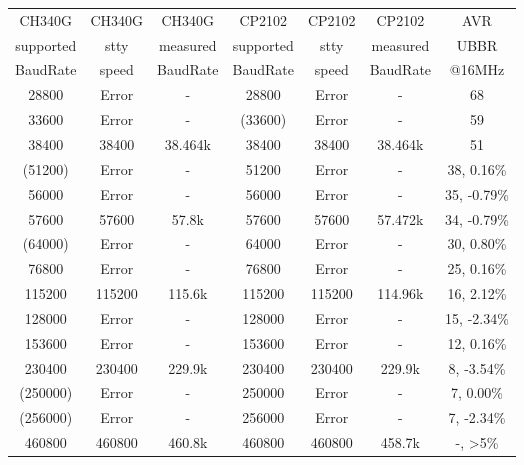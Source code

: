 \begin{table}[H]
  \begin{center}
    \begin{tabular}{| c | c | c || c | c | c || c |}
    \hline
    CH340G     & CH340G & CH340G    &  CP2102   & CP2102 & CP2102    & AVR \\
    supported  & stty   & measured  & supported & stty   & measured  & UBBR  \\
    BaudRate   & speed  & BaudRate  & BaudRate  & speed  & BaudRate  & @16MHz \\
    \hline
    \hline
      28800  &  Error   &   -       &  28800    & Error  &    -      &   68 \\
    \hline
      33600  &  Error   &   -       & (33600)   & Error  &    -      &   59  \\
    \hline
      38400  &  38400   &  38.464k  &  38400    & 38400  &  38.464k   &   51  \\
    \hline
     (51200) &  Error   &   -       &  51200    & Error  &    -      &   38,  0.16\%  \\
    \hline
      56000  &  Error   &   -       &  56000    & Error  &    -      &   35, -0.79\%  \\
    \hline
      57600  &  57600   &  57.8k    &  57600    & 57600  &  57.472k   &   34, -0.79\%  \\
    \hline
     (64000) &  Error   &   -       &  64000    & Error  &    -      &   30,  0.80\%  \\
    \hline
      76800  &  Error   &   -       &  76800    & Error  &    -      &   25, 0.16\%  \\
    \hline
     115200  &  115200  &  115.6k   &  115200   & 115200 & 114.96k   &   16, 2.12\%  \\
    \hline
     128000  &  Error   &   -       &  128000   & Error  &    -      &   15, -2.34\%  \\
    \hline
     153600  &  Error   &   -       &  153600   & Error  &    -      &   12, 0.16\%  \\
    \hline
     230400  &  230400  &  229.9k   &  230400   & 230400 &  229.9k   &   8, -3.54\%  \\
    \hline
    (250000)  &  Error   &   -       &  250000   & Error  &    -      &   7, 0.00\%  \\
    \hline
    (256000)  &  Error   &   -       &  256000   & Error  &    -      &   7, -2.34\%  \\
    \hline
     460800  &  460800  &  460.8k   &  460800   & 460800 & 458.7k    &   -, >5\%  \\

\end{tabular}
\end{center}
\end{table}

